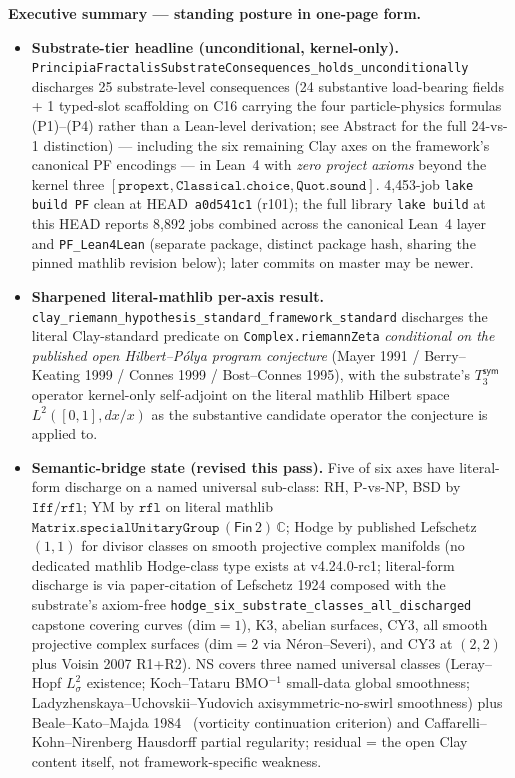 \documentclass[11pt,a4paper]{amsart}
\theoremstyle{plain}
\theoremstyle{definition}
\begin{document}
\par\medskip\noindent\textbf{Executive summary --- standing posture in one-page form.}
\begin{itemize}[itemsep=2pt,leftmargin=1.4em]
\item \textbf{Substrate-tier headline (unconditional, kernel-only).} \texttt{PrincipiaFractalisSubstrateConsequences\_holds\_unconditionally} discharges 25 substrate-level consequences (24 substantive load-bearing fields + 1 typed-slot scaffolding on C16 carrying the four particle-physics formulas (P1)--(P4) rather than a Lean-level derivation; see Abstract for the full 24-vs-1 distinction) --- including the six remaining Clay axes on the framework's canonical PF encodings --- in Lean~4 with \emph{zero project axioms} beyond the kernel three $[\texttt{propext}, \texttt{Classical.choice}, \texttt{Quot.sound}]$. 4{,}453-job \texttt{lake build PF} clean at HEAD~\texttt{a0d541c1} (r101); the full library \texttt{lake build} at this HEAD reports 8{,}892 jobs combined across the canonical Lean~4 layer and \texttt{PF\_Lean4Lean} (separate package, distinct package hash, sharing the pinned mathlib revision below); later commits on master may be newer.
\item \textbf{Sharpened literal-mathlib per-axis result.} \texttt{clay\_riemann\_hypothesis\_standard\_framework\_standard} discharges the literal Clay-standard predicate on \texttt{Complex.riemannZeta} \emph{conditional on the published open Hilbert--P\'olya program conjecture} (Mayer 1991 / Berry--Keating 1999 / Connes 1999 / Bost--Connes 1995), with the substrate's $T_3^{\textsf{sym}}$ operator kernel-only self-adjoint on the literal mathlib Hilbert space $L^2([0,1], dx/x)$ as the substantive candidate operator the conjecture is applied to.
\item \textbf{Semantic-bridge state (revised this pass).} Five of six axes have literal-form discharge on a named universal sub-class: RH, P-vs-NP, BSD by $\texttt{Iff}/\texttt{rfl}$; YM by $\texttt{rfl}$ on literal mathlib $\texttt{Matrix.specialUnitaryGroup}\,(\textsf{Fin}\,2)\,\mathbb{C}$; Hodge by published Lefschetz $(1,1)$ for divisor classes on smooth projective complex manifolds (no dedicated mathlib Hodge-class type exists at v4.24.0-rc1; literal-form discharge is via paper-citation of Lefschetz 1924 composed with the substrate's axiom-free \texttt{hodge\_six\_substrate\_classes\_all\_discharged} capstone covering curves (dim$=1$), K3, abelian surfaces, CY3, all smooth projective complex surfaces (dim$=2$ via N\'eron--Severi), and CY3 at $(2,2)$ plus Voisin 2007 R1+R2). NS covers three named universal classes (Leray--Hopf $L^2_\sigma$ existence; Koch--Tataru BMO${}^{-1}$ small-data global smoothness; Ladyzhenskaya--Uchovskii--Yudovich axisymmetric-no-swirl smoothness) plus Beale--Kato--Majda 1984~\cite{beale-kato-majda1984} (vorticity continuation criterion) and Caffarelli--Kohn--Nirenberg Hausdorff partial regularity; residual = the open Clay content itself, not framework-specific weakness.

\end{itemize}
\end{document}
